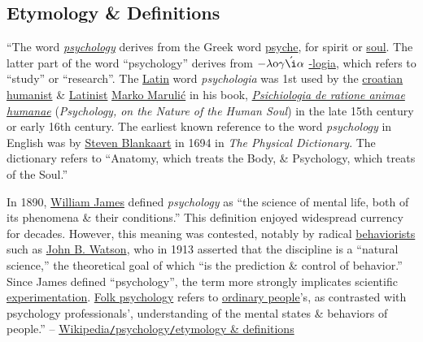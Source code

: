 \documentclass[oneside]{book}
\numberwithin{equation}{section}
\begin{document}
\subsection{Etymology \& Definitions}
``The word \href{https://en.wiktionary.org/wiki/psychology}{\textit{psychology}} derives from the Greek word \href{https://en.wikipedia.org/wiki/Psyche_(psychology)}{psyche}, for spirit or \href{https://en.wikipedia.org/wiki/Soul_(spirit)}{soul}. The latter part of the word ``psychology'' derives from $-\lambda{\rm o}\gamma\acute{\i}\alpha$ \href{https://en.wiktionary.org/wiki/-logia}{-logia}, which refers to ``study'' or ``research''. The \href{https://en.wikipedia.org/wiki/Latin}{Latin} word \textit{psychologia} was 1st used by the \href{https://en.wikipedia.org/wiki/Croatia}{croatian} \href{https://en.wikipedia.org/wiki/Humanism}{humanist} \& \href{https://en.wikipedia.org/wiki/Croatian_latinistic_literature}{Latinist} \href{https://en.wikipedia.org/wiki/Marko_Maruli%C4%87}{Marko Maruli\'c} in his book, \href{https://en.wikipedia.org/wiki/Psichiologia_de_ratione_animae_humanae}{\textit{Psichiologia de ratione animae humanae}} (\textit{Psychology, on the Nature of the Human Soul}) in the late 15th century or early 16th century. The earliest known reference to the word \textit{psychology} in English was by \href{https://en.wikipedia.org/wiki/Steven_Blankaart}{Steven Blankaart} in 1694 in \textit{The Physical Dictionary}. The dictionary refers to ``Anatomy, which treats the Body, \& Psychology, which treats of the Soul.''

In 1890, \href{https://en.wikipedia.org/wiki/William_James}{William James} defined \textit{psychology} as ``the science of mental life, both of its phenomena \& their conditions.'' This definition enjoyed widespread currency for decades. However, this meaning was contested, notably by radical \href{https://en.wikipedia.org/wiki/Behaviorism}{behaviorists} such as \href{https://en.wikipedia.org/wiki/John_B._Watson}{John B. Watson}, who in 1913 asserted that the discipline is a ``natural science,'' the theoretical goal of which ``is the prediction \& control of behavior.'' Since James defined ``psychology'', the term more strongly implicates scientific \href{https://en.wikipedia.org/wiki/Experiment}{experimentation}. \href{https://en.wikipedia.org/wiki/Folk_psychology}{Folk psychology} refers to \href{https://en.wikipedia.org/wiki/Laity}{ordinary people}'s, as contrasted with psychology professionals', understanding of the mental states \& behaviors of people.'' -- \href{https://en.wikipedia.org/wiki/Psychology#Etymology_and_definitions}{Wikipedia\texttt{/}psychology\texttt{/}etymology \& definitions}
\end{document}
